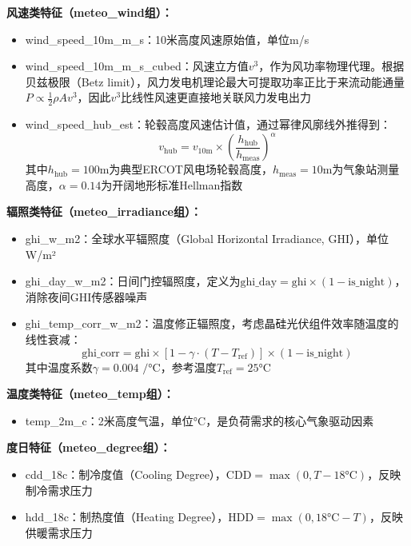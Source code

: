 \textbf{风速类特征（meteo\_wind组）：}
\begin{itemize}
  \item wind\_speed\_10m\_m\_s：10米高度风速原始值，单位m/s
  \item wind\_speed\_10m\_m\_s\_cubed：风速立方值$v^3$，作为风功率物理代理。根据贝兹极限（Betz limit），风力发电机理论最大可提取功率正比于来流动能通量$P \propto \frac{1}{2}\rho A v^3$\cite{betz1920maximum}，因此$v^3$比线性风速更直接地关联风力发电出力
  \item wind\_speed\_hub\_est：轮毂高度风速估计值，通过幂律风廓线外推得到：
  \begin{equation}
  v_{\text{hub}} = v_{10\text{m}} \times \left(\frac{h_{\text{hub}}}{h_{\text{meas}}}\right)^{\alpha}
  \end{equation}
  其中$h_{\text{hub}} = 100\text{m}$为典型ERCOT风电场轮毂高度，$h_{\text{meas}} = 10\text{m}$为气象站测量高度，$\alpha = 0.14$为开阔地形标准Hellman指数\cite{hellman1916wind}
\end{itemize}

\textbf{辐照类特征（meteo\_irradiance组）：}
\begin{itemize}
  \item ghi\_w\_m2：全球水平辐照度（Global Horizontal Irradiance, GHI），单位W/m²
  \item ghi\_day\_w\_m2：日间门控辐照度，定义为$\text{ghi\_day} = \text{ghi} \times (1 - \text{is\_night})$，消除夜间GHI传感器噪声
  \item ghi\_temp\_corr\_w\_m2：温度修正辐照度，考虑晶硅光伏组件效率随温度的线性衰减\cite{liu2025kan2}：
  \begin{equation}
  \text{ghi\_corr} = \text{ghi} \times \left[1 - \gamma \cdot (T - T_{\text{ref}})\right] \times (1 - \text{is\_night})
  \end{equation}
  其中温度系数$\gamma = 0.004\text{ /°C}$，参考温度$T_{\text{ref}} = 25\text{°C}$
\end{itemize}

\textbf{温度类特征（meteo\_temp组）：}
\begin{itemize}
  \item temp\_2m\_c：2米高度气温，单位°C，是负荷需求的核心气象驱动因素
\end{itemize}

\textbf{度日特征（meteo\_degree组）：}
\begin{itemize}
  \item cdd\_18c：制冷度值（Cooling Degree），$\text{CDD} = \max(0, T - 18\text{°C})$，反映制冷需求压力
  \item hdd\_18c：制热度值（Heating Degree），$\text{HDD} = \max(0, 18\text{°C} - T)$，反映供暖需求压力
\end{itemize}

